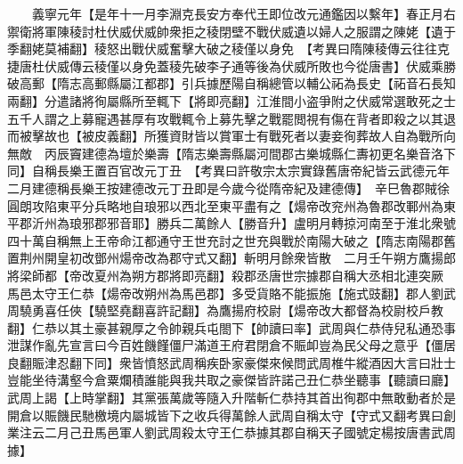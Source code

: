 　　義寧元年【是年十一月李淵克長安方奉代王即位改元通鑑因以繫年】春正月右禦衛將軍陳稜討杜伏威伏威帥衆拒之稜閉壁不戰伏威遺以婦人之服謂之陳姥【遺于季翻姥莫補翻】稜怒出戰伏威奮擊大破之稜僅以身免　【考異曰隋陳稜傳云往往克捷唐杜伏威傳云稜僅以身免蓋稜先破李子通等後為伏威所敗也今從唐書】伏威乘勝破高郵【隋志高郵縣屬江都郡】引兵據歷陽自稱總管以輔公祏為長史【祏音石長知兩翻】分遣諸將徇屬縣所至輒下【將即亮翻】江淮間小盗爭附之伏威常選敢死之士五千人謂之上募寵遇甚厚有攻戰輒令上募先擊之戰罷閲視有傷在背者即殺之以其退而被擊故也【被皮義翻】所獲資財皆以賞軍士有戰死者以妻妾徇葬故人自為戰所向無敵　丙辰竇建德為壇於樂壽【隋志樂壽縣屬河間郡古樂城縣仁夀初更名樂音洛下同】自稱長樂王置百官改元丁丑　【考異曰許敬宗太宗實錄舊唐帝紀皆云武德元年二月建德稱長樂王按建德改元丁丑即是今歲今從隋帝紀及建德傳】　辛巳魯郡賊徐圓朗攻陷東平分兵略地自琅邪以西北至東平盡有之【煬帝改兖州為魯郡改鄆州為東平郡沂州為琅邪郡邪音耶】勝兵二萬餘人【勝音升】盧明月轉掠河南至于淮北衆號四十萬自稱無上王帝命江都通守王世充討之世充與戰於南陽大破之【隋志南陽郡舊置荆州開皇初改鄧州煬帝改為郡守式又翻】斬明月餘衆皆散　二月壬午朔方鷹揚郎將梁師都【帝改夏州為朔方郡將即亮翻】殺郡丞唐世宗據郡自稱大丞相北連突厥　馬邑太守王仁恭【煬帝改朔州為馬邑郡】多受貨賂不能振施【施式豉翻】郡人劉武周驍勇喜任俠【驍堅堯翻喜許記翻】為鷹揚府校尉【煬帝改大都督為校尉校戶教翻】仁恭以其土豪甚親厚之令帥親兵屯閤下【帥讀曰率】武周與仁恭侍兒私通恐事泄謀作亂先宣言曰今百姓饑饉僵尸滿道王府君閉倉不賑卹豈為民父母之意乎【僵居良翻賑津忍翻下同】衆皆憤怒武周稱疾卧家豪傑來候問武周椎牛縱酒因大言曰壯士豈能坐待溝壑今倉粟爛積誰能與我共取之豪傑皆許諾己丑仁恭坐聽事【聽讀曰廳】武周上謁【上時掌翻】其黨張萬歲等隨入升階斬仁恭持其首出徇郡中無敢動者於是開倉以賑饑民馳檄境内屬城皆下之收兵得萬餘人武周自稱太守【守式又翻考異曰創業注云二月己丑馬邑軍人劉武周殺太守王仁恭據其郡自稱天子國號定楊按唐書武周據】


